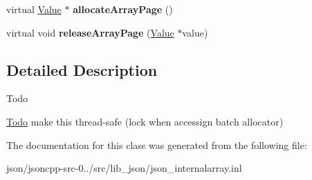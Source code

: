 \begin{DoxyCompactItemize}
\item 
\hypertarget{class_default_value_array_allocator_a7b5bf432a9564dbfe5c1e8c38f54f64a}{virtual \hyperlink{union_value}{Value} $\ast$ {\bfseries allocate\+Array\+Page} ()}\label{class_default_value_array_allocator_a7b5bf432a9564dbfe5c1e8c38f54f64a}

\item 
\hypertarget{class_default_value_array_allocator_a4f01eadeb6149a2417f8a7fff2e3ea6d}{virtual void {\bfseries release\+Array\+Page} (\hyperlink{union_value}{Value} $\ast$value)}\label{class_default_value_array_allocator_a4f01eadeb6149a2417f8a7fff2e3ea6d}

\end{DoxyCompactItemize}


\subsection{Detailed Description}
\begin{DoxyRefDesc}{Todo}
\item[\hyperlink{todo__todo000054}{Todo}]make this thread-\/safe (lock when accessign batch allocator) \end{DoxyRefDesc}


The documentation for this class was generated from the following file\+:\begin{DoxyCompactItemize}
\item 
json/jsoncpp-\/src-\/0../src/lib\+\_\+json/json\+\_\+internalarray.\+inl\end{DoxyCompactItemize}
